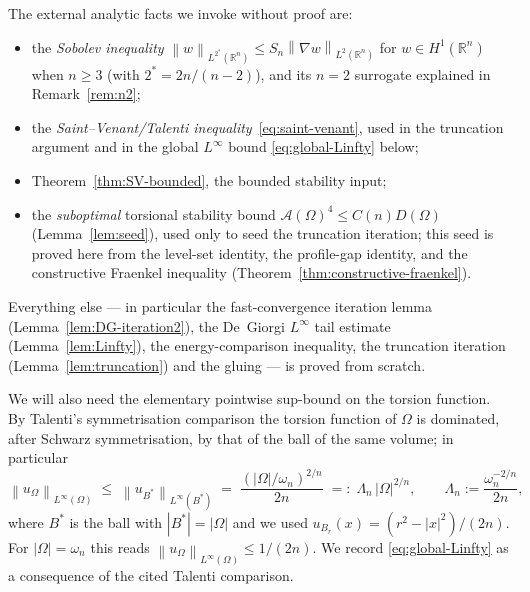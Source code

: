 \documentclass[11pt]{amsart}
\theoremstyle{definition}
\newcommand{\R}{\mathbb R}
\newcommand{\Om}{\Omega}
\newcommand{\Fr}{\mathcal A}
\newcommand{\abs}[1]{\left|#1\right|}
\newcommand{\norm}[1]{\left\|#1\right\|}
\begin{document}
The external analytic facts we invoke without proof are:
\begin{itemize}
\item the \emph{Sobolev inequality}
   $\norm{w}_{L^{2^*}(\R^n)}\le S_n\norm{\nabla w}_{L^2(\R^n)}$ for
   $w\in H^1(\R^n)$ when $n\ge3$ (with $2^*=2n/(n-2)$), and its $n=2$
   surrogate explained in Remark~\ref{rem:n2};
\item the \emph{Saint--Venant/Talenti inequality}~\eqref{eq:saint-venant},
   used in the truncation argument and in the global $L^\infty$ bound
   \eqref{eq:global-Linfty} below;
\item Theorem~\ref{thm:SV-bounded}, the bounded stability input;
\item the \emph{suboptimal} torsional stability bound
   $\Fr(\Om)^4\le C(n)D(\Om)$ (Lemma~\ref{lem:seed}), used only to seed
   the truncation iteration; this seed is proved here from the level-set
   identity, the profile-gap identity, and the constructive Fraenkel
   inequality (Theorem~\ref{thm:constructive-fraenkel}).
\end{itemize}
Everything else --- in particular the fast-convergence iteration lemma
(Lemma~\ref{lem:DG-iteration2}), the De~Giorgi $L^\infty$ tail estimate
(Lemma~\ref{lem:Linfty}), the energy-comparison inequality, the truncation
iteration (Lemma~\ref{lem:truncation}) and the gluing --- is proved from
scratch.

We will also need the elementary pointwise sup-bound on the torsion
function. By Talenti's symmetrisation comparison the torsion function of
$\Om$ is dominated, after Schwarz symmetrisation, by that of the ball of
the same volume; in particular
\begin{equation}\label{eq:global-Linfty}
   \norm{u_\Om}_{L^\infty(\Om)}\;\le\;\norm{u_{B^*}}_{L^\infty(B^*)}
   \;=\;\frac{(\abs{\Om}/\omega_n)^{2/n}}{2n}
   \;=:\;\Lambda_n\,\abs{\Om}^{2/n},
   \qquad \Lambda_n:=\frac{\omega_n^{-2/n}}{2n},
\end{equation}
where $B^*$ is the ball with $\abs{B^*}=\abs{\Om}$ and we used
$u_{B_r}(x)=(r^2-\abs{x}^2)/(2n)$. For $\abs{\Om}=\omega_n$ this reads
$\norm{u_\Om}_{L^\infty(\Om)}\le 1/(2n)$. We record \eqref{eq:global-Linfty}
as a consequence of the cited Talenti comparison.
\end{document}
